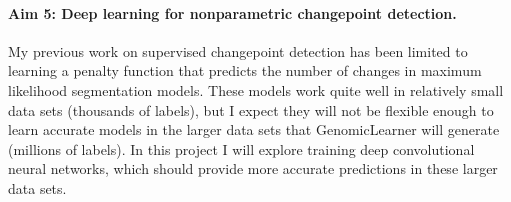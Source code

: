 \documentclass{article}
\begin{document}

\paragraph{Aim 5: Deep learning for nonparametric changepoint
  detection.} My previous work on supervised changepoint detection has
been limited to learning a penalty function that predicts the number
of changes in maximum likelihood segmentation models. These models
work quite well in relatively small data sets (thousands of labels),
but I expect they will not be flexible enough to learn accurate models
in the larger data sets that GenomicLearner will generate
(millions of labels). In this project I will explore training deep
convolutional neural networks, which should provide more accurate
predictions in these larger data sets.


\end{document}
